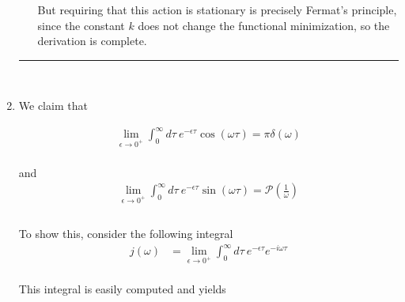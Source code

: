 \documentclass[]{article}
\begin{document}
\begin{enumerate}[1)]
\begin{enumerate}[a)]
But requiring that this action is stationary is precisely Fermat's principle, since the constant $k$ does not change the functional minimization, so the derivation is complete. \\




\end{enumerate}

\noindent\rule{15cm}{0.4pt} \\


\item We claim that


\begin{equation}
\begin{aligned}
\lim_{\epsilon \to 0^+} \int_{ 0 }^{\infty} d \tau \: e^{ - \epsilon \tau} \cos(\omega \tau )  = \pi \delta (\omega )
\end{aligned}
\end{equation} \\

and \\

\begin{equation}
\begin{aligned}
\lim_{\epsilon \to 0^+} \int_{ 0 }^{\infty} d \tau \: e^{ - \epsilon \tau} \sin(\omega \tau )  = \mathscr{P} \left( \frac{1}{\omega}  \right) \\
\end{aligned}
\end{equation} \\

To show this, consider the following integral \\


\begin{equation}
\begin{aligned}
j(\omega) & = \lim_{\epsilon \to 0^+} \int_{0 }^{\infty} d \tau \: e^{ - \epsilon \tau} e^{ - i \omega \tau}  
\end{aligned}
\end{equation} \\

This integral is easily computed and yields


\end{enumerate}
\end{document}
